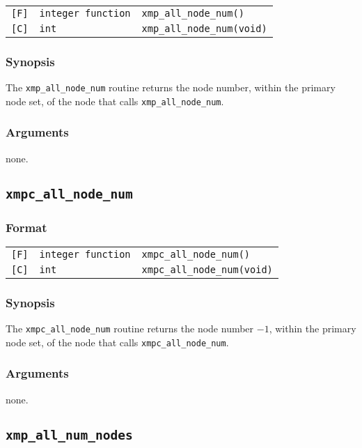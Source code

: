 \begin{tabular}{lll}
\verb![F]!&  {\tt integer function}& {\tt xmp\_all\_node\_num()}\\
\verb![C]!&  {\tt int}& {\tt xmp\_all\_node\_num(void)}
\end{tabular}

\subsubsection*{Synopsis}
The {\tt xmp\_all\_node\_num} routine returns the node number,
within the primary node set, of the node that calls {\tt xmp\_all\_node\_num}.

\subsubsection*{Arguments}
none.

\subsection{\tt xmpc\_all\_node\_num}\label{sub:xmpcallnodenum}

\subsubsection*{Format}

\begin{tabular}{lll}
\verb![F]!&  {\tt integer function}& {\tt xmpc\_all\_node\_num()}\\
\verb![C]!&  {\tt int}& {\tt xmpc\_all\_node\_num(void)}
\end{tabular}

\subsubsection*{Synopsis}
The {\tt xmpc\_all\_node\_num} routine returns the node number $- 1$,
within the primary node set, of the node that calls {\tt xmpc\_all\_node\_num}.

\subsubsection*{Arguments}
none.

\subsection{\tt xmp\_all\_num\_nodes}

